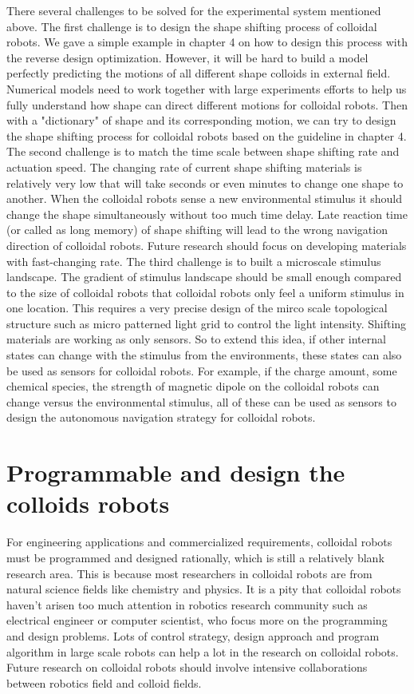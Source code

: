 There several challenges to be solved for the experimental system mentioned above. The first challenge  is to design the shape shifting process of colloidal robots. We gave a simple example in chapter 4 on how to design this process with the reverse design optimization. However, it will be hard to build a model perfectly predicting the motions of all different shape colloids in external field. Numerical models need to work together with large experiments efforts to help us fully understand how shape can direct different motions for colloidal robots. \autocite{lee2019directed} Then with a "dictionary" of shape and its corresponding motion, we can try to design the shape shifting process for colloidal robots based on the guideline in chapter 4. The second challenge is to match the time scale between shape shifting rate and actuation speed. The changing rate of current shape shifting materials is relatively very low that will take seconds or even minutes to change one shape to another. When the colloidal robots sense a new environmental stimulus it should change the shape simultaneously without too  much time delay. Late reaction time (or called as long memory) of shape shifting will  lead to the wrong navigation direction of colloidal robots. Future research should focus on developing materials with fast-changing rate. The third challenge is to built a microscale stimulus landscape. The gradient of stimulus landscape should be small enough compared to the size of colloidal robots that colloidal robots only feel a uniform stimulus in one location. This requires a very precise  design of the mirco scale topological structure such as micro patterned light grid to control the light intensity. Shifting materials are working as only sensors. So to extend this idea, if other internal states can change with the stimulus from the environments, these states can also be used as sensors for colloidal robots. For example, if the charge amount, some chemical species, the strength of magnetic dipole on the colloidal robots can change versus the environmental stimulus, all of these can be used as sensors to design the autonomous navigation strategy for colloidal robots.  




\section{Programmable and design the colloids robots}
For engineering applications and commercialized requirements, colloidal robots must be programmed and designed rationally, which is still a relatively blank research area. This is because most researchers in colloidal robots are from natural science fields like chemistry and physics. It is a pity that colloidal robots haven't arisen too much attention in robotics research community such as electrical engineer or computer scientist, who focus more on the programming and design problems.\autocite{das2019cellular}  Lots of control strategy, design approach and program algorithm in large scale robots can help a lot in the research on colloidal robots.  Future research on colloidal robots should involve intensive collaborations between robotics field and colloid fields.

